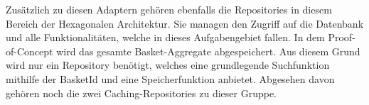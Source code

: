Zusätzlich zu diesen Adaptern gehören ebenfalls die Repositories in diesem Bereich der Hexagonalen Architektur. Sie managen den Zugriff auf die Datenbank und alle Funktionalitäten, welche in dieses Aufgabengebiet fallen. In dem Proof-of-Concept wird das gesamte Basket-Aggregate abgespeichert. Aus diesem Grund wird nur ein Repository benötigt, welches eine grundlegende Suchfunktion mithilfe der BasketId und eine Speicherfunktion anbietet. Abgesehen davon gehören noch die zwei Caching-Repositories zu dieser Gruppe. 